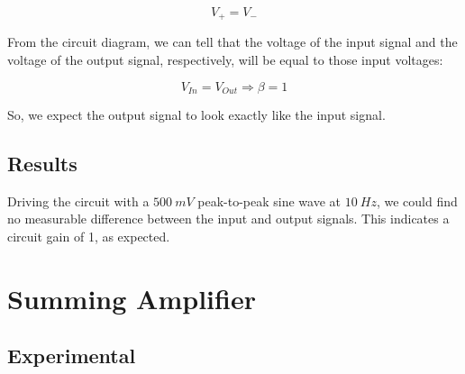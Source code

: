 \documentclass[11pt]{article}
\begin{document}
\begin{equation}
    V_{+} = V_{-}
\end{equation}

From the circuit diagram, we can tell that the voltage of the input signal and the voltage of the output signal, respectively, will be equal to those input voltages:

\begin{equation}
    V_{In} = V_{Out} \Longrightarrow \beta = 1
\end{equation}

So, we expect the output signal to look exactly like the input signal.


\subsection{Results}

Driving the circuit with a $500\ mV$ peak-to-peak sine wave at $10\ Hz$, we could find no measurable difference between the input and output signals. This indicates a circuit gain of 1, as expected.


\section{Summing Amplifier}
\subsection{Experimental}
\end{document}
